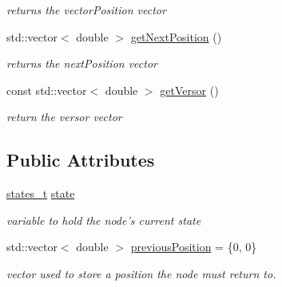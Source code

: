 \begin{DoxyCompactItemize}
\begin{DoxyCompactList}\small\item\em returns the vector\-Position vector \end{DoxyCompactList}\item 
std\-::vector$<$ double $>$ \hyperlink{class_node_a771223d354d7b3037c454cc5c9d340d0}{get\-Next\-Position} ()
\begin{DoxyCompactList}\small\item\em returns the next\-Position vector \end{DoxyCompactList}\item 
const std\-::vector$<$ double $>$ \hyperlink{class_node_a0e573ebfab9c6db141e39e8cd76064ed}{get\-Versor} ()
\begin{DoxyCompactList}\small\item\em return the versor vector \end{DoxyCompactList}\end{DoxyCompactItemize}
\subsection*{Public Attributes}
\begin{DoxyCompactItemize}
\item 
\hypertarget{class_node_a3dc90021cc03269bfc754c815d12f701}{\hyperlink{node_8h_ae4bcd51a032844028300b600d585d021}{states\-\_\-t} \hyperlink{class_node_a3dc90021cc03269bfc754c815d12f701}{state}}\label{class_node_a3dc90021cc03269bfc754c815d12f701}

\begin{DoxyCompactList}\small\item\em variable to hold the node's current state \end{DoxyCompactList}\item 
\hypertarget{class_node_a053dd938575ddfbaef5bf5390ecd42e5}{std\-::vector$<$ double $>$ \hyperlink{class_node_a053dd938575ddfbaef5bf5390ecd42e5}{previous\-Position} = \{0, 0\}}\label{class_node_a053dd938575ddfbaef5bf5390ecd42e5}

\begin{DoxyCompactList}\small\item\em vector used to store a position the node must return to. \end{DoxyCompactList}\end{DoxyCompactItemize}


